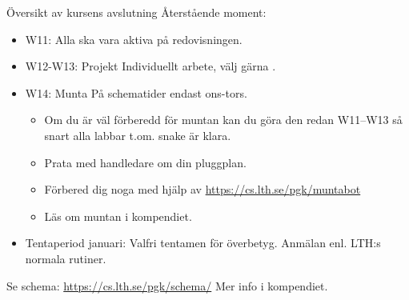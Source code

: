 \begin{Slide}{Översikt av kursens avslutning}
Återstående moment:
\begin{itemize}
\item W11:  \hfill Alla ska vara aktiva på redovisningen.
\item W12-W13: Projekt \hfill Individuellt arbete, välj gärna .
\item W14: Munta \hfill På schematider endast ons-tors.
\begin{itemize}
\item Om du är väl förberedd för muntan kan du göra den redan W11--W13 så snart alla labbar t.om. snake är klara. 
\item Prata med handledare om din pluggplan.
\item Förbered dig noga med hjälp av \url{https://cs.lth.se/pgk/muntabot}
\item Läs om muntan i kompendiet.
\end{itemize}
\item Tentaperiod januari: Valfri tentamen för överbetyg. Anmälan enl. LTH:s normala rutiner. 
\end{itemize}
Se schema: \url{https://cs.lth.se/pgk/schema/}
\ifkompendium\else
\newline
Mer info i kompendiet.
\fi
\end{Slide}




